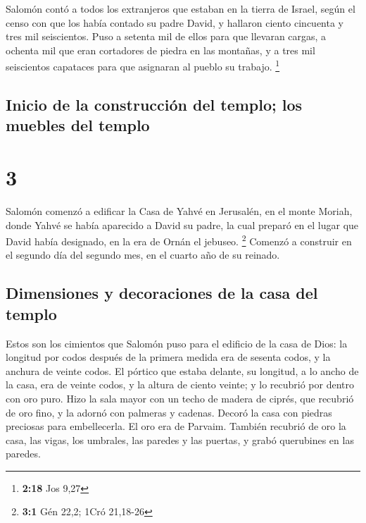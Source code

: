  Salomón contó a todos los extranjeros que estaban en la
tierra de Israel, según el censo con que los había contado su padre
David, y hallaron ciento cincuenta y tres mil seiscientos.
 Puso a setenta mil de ellos para que llevaran cargas, a
ochenta mil que eran cortadores de piedra en las montañas, y a tres mil
seiscientos capataces para que asignaran al pueblo su trabajo.
\footnote{\textbf{2:18} Jos 9,27}

\hypertarget{inicio-de-la-construcciuxf3n-del-templo-los-muebles-del-templo}{%
\subsection{Inicio de la construcción del templo; los muebles del
templo}\label{inicio-de-la-construcciuxf3n-del-templo-los-muebles-del-templo}}

\hypertarget{section-2}{%
\section{3}\label{section-2}}

 Salomón comenzó a edificar la Casa de Yahvé en Jerusalén,
en el monte Moriah, donde Yahvé se había aparecido a David su padre, la
cual preparó en el lugar que David había designado, en la era de Ornán
el jebuseo. \footnote{\textbf{3:1} Gén 22,2; 1Cró 21,18-26}
 Comenzó a construir en el segundo día del segundo mes, en
el cuarto año de su reinado.

\hypertarget{dimensiones-y-decoraciones-de-la-casa-del-templo}{%
\subsection{Dimensiones y decoraciones de la casa del
templo}\label{dimensiones-y-decoraciones-de-la-casa-del-templo}}

 Estos son los cimientos que Salomón puso para el edificio
de la casa de Dios: la longitud por codos después de la primera medida
era de sesenta codos, y la anchura de veinte codos.  El
pórtico que estaba delante, su longitud, a lo ancho de la casa, era de
veinte codos, y la altura de ciento veinte; y lo recubrió por dentro con
oro puro.  Hizo la sala mayor con un techo de madera de
ciprés, que recubrió de oro fino, y la adornó con palmeras y cadenas.
 Decoró la casa con piedras preciosas para embellecerla.
El oro era de Parvaim.  También recubrió de oro la casa,
las vigas, los umbrales, las paredes y las puertas, y grabó querubines
en las paredes.

